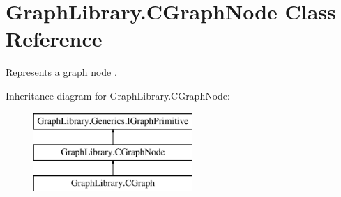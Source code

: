 \hypertarget{class_graph_library_1_1_c_graph_node}{}\section{Graph\+Library.\+C\+Graph\+Node Class Reference}
\label{class_graph_library_1_1_c_graph_node}


Represents a graph node .  


Inheritance diagram for Graph\+Library.\+C\+Graph\+Node\+:\begin{figure}[H]
\begin{center}
\leavevmode
\includegraphics[height=3.000000cm]{class_graph_library_1_1_c_graph_node}
\end{center}
\end{figure}
